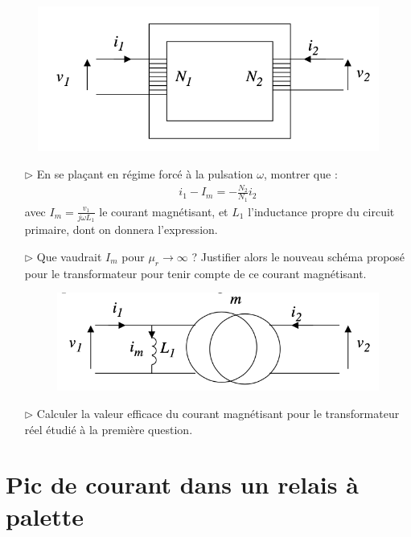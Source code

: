 \documentclass{report}
\begin{document}
\begin{figure}[h!]
	\centering
		\includegraphics[scale=0.5]{transfo2.png}
\end{figure}		


\begin{itemize}

	\item[$\triangleright$] En se plaçant en régime forcé à la pulsation $\omega$, montrer que :
	\begin{align*}
		i_1-I_m=-\frac{N_2}{N_1}i_2
	\end{align*}
	avec $I_m=\frac{v_1}{j\omega L_1}$ le courant magnétisant, et $L_1$ l'inductance propre du circuit primaire, dont on donnera l'expression.
	
	\item[$\triangleright$] Que vaudrait $I_m$ pour $\mu_r\longrightarrow\infty$ ? Justifier alors le nouveau schéma proposé pour le transformateur pour tenir compte de ce courant magnétisant.

\begin{figure}[h!]
	\centering
		\includegraphics[scale=0.5]{transfo3.png}
\end{figure}		

	\item[$\triangleright$] Calculer la valeur efficace du courant magnétisant pour le transformateur réel étudié à la première question.

\end{itemize}

\newpage

\section*{Pic de courant dans un relais à palette}
\end{document}
